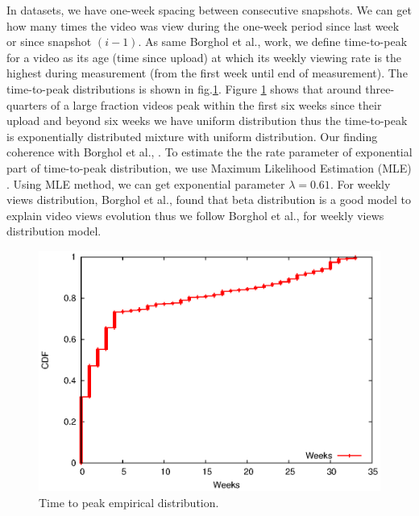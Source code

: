 \documentclass[10pt,final,journal,a4paper]{IEEEtran}
\begin{document}
In datasets, we have one-week spacing between consecutive snapshots.  
We can get how many times the video was view during the one-week period since last week or since snapshot $(i-1)$. 
As same Borghol et al., \cite{Borghol:2011:CMP:2039452.2039717} work, we define time-to-peak for a video as its age (time since upload) at which its weekly viewing rate is the highest during measurement (from the first week until end of measurement).
The time-to-peak distributions is shown in fig.\ref{fig:timetopeak}.
Figure \ref{fig:timetopeak} shows that around three-quarters of a large fraction videos peak within the first six weeks since their upload and beyond six weeks we have uniform distribution thus the time-to-peak is exponentially distributed mixture with uniform distribution. 
Our finding coherence with Borghol et al., \cite{Borghol:2011:CMP:2039452.2039717}.
To estimate the the rate parameter of exponential part of time-to-peak distribution, we use Maximum Likelihood Estimation (MLE) \cite{clauset2009power}.
Using MLE method, we can get exponential parameter $\lambda = 0.61$. 
For weekly views distribution, Borghol et al., \cite{Borghol:2011:CMP:2039452.2039717} found that beta distribution is a good model to explain video views evolution thus we follow Borghol et al., \cite{Borghol:2011:CMP:2039452.2039717} for  weekly views distribution model.

\begin{figure}[!t]
\begin{center}
\includegraphics[scale=0.6]{graphs/timetopeak.eps}
\end{center}
\caption{Time to peak empirical distribution.}
\label{fig:timetopeak}
\end{figure} 
\end{document}
